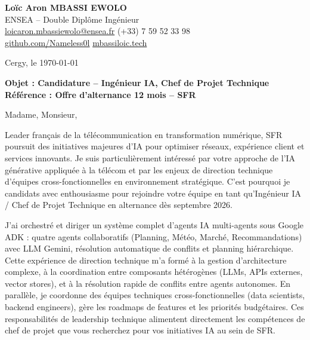 \documentclass[a4paper,11pt]{article}
\begin{document}
\noindent
\textbf{Lo\"ic Aron MBASSI EWOLO} \\
ENSEA -- Double Dipl\^ome Ing\'enieur \\
\href{mailto:loicaron.mbassiewolo@ensea.fr}{loicaron.mbassiewolo@ensea.fr} \quad (+33) 7 59 52 33 98 \\
\href{https://github.com/Nameless0l}{github.com/Nameless0l} \quad \href{https://mbassiloic.tech}{mbassiloic.tech}

\vspace{1em}
\noindent
Cergy, le \today

\vspace{1em}
\noindent
\textbf{Objet : Candidature -- Ing\'enieur IA, Chef de Projet Technique} \\
\textbf{R\'ef\'erence : Offre d'alternance 12 mois -- SFR}

\vspace{1.5em}
\noindent Madame, Monsieur,

\vspace{0.8em}
\noindent Leader français de la télécommunication en transformation numérique, SFR poursuit des initiatives majeures d'IA pour optimiser réseaux, expérience client et services innovants. Je suis particulièrement intéressé par votre approche de l'IA générative appliquée à la télécom et par les enjeux de direction technique d'équipes cross-fonctionnelles en environnement stratégique. C'est pourquoi je candidats avec enthousiasme pour rejoindre votre équipe en tant qu'Ingénieur IA / Chef de Projet Technique en alternance dès septembre 2026.

\vspace{0.8em}
\noindent J'ai orchestré et diriger un système complet d'agents IA multi-agents sous Google ADK : quatre agents collaboratifs (Planning, Météo, Marché, Recommandations) avec LLM Gemini, résolution automatique de conflits et planning hiérarchique. Cette expérience de direction technique m'a formé à la gestion d'architecture complexe, à la coordination entre composants hétérogènes (LLMs, APIs externes, vector stores), et à la résolution rapide de conflits entre agents autonomes. En parallèle, je coordonne des équipes techniques cross-fonctionnelles (data scientists, backend engineers), gère les roadmaps de features et les priorités budgétaires. Ces responsabilités de leadership technique alimentent directement les compétences de chef de projet que vous recherchez pour vos initiatives IA au sein de SFR.
\end{document}

